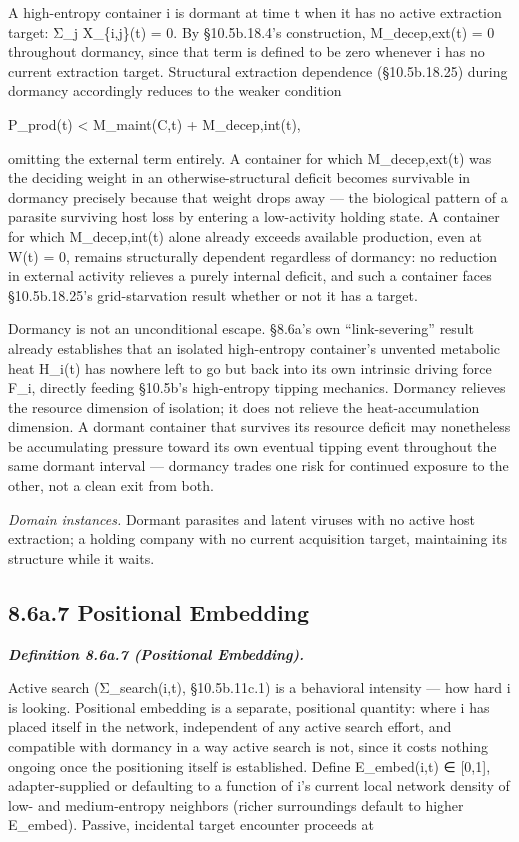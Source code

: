 \documentclass[
]{article}
\begin{document}
A high-entropy container i is dormant at time t when it has no active
extraction target: Σ\_j X\_\{i,j\}(t) = 0. By §10.5b.18.4's
construction, M\_decep,ext(t) = 0 throughout dormancy, since that term
is defined to be zero whenever i has no current extraction target.
Structural extraction dependence (§10.5b.18.25) during dormancy
accordingly reduces to the weaker condition

P\_prod(t) \textless{} M\_maint(C,t) + M\_decep,int(t),

omitting the external term entirely. A container for which
M\_decep,ext(t) was the deciding weight in an otherwise-structural
deficit becomes survivable in dormancy precisely because that weight
drops away --- the biological pattern of a parasite surviving host loss
by entering a low-activity holding state. A container for which
M\_decep,int(t) alone already exceeds available production, even at W(t)
= 0, remains structurally dependent regardless of dormancy: no reduction
in external activity relieves a purely internal deficit, and such a
container faces §10.5b.18.25's grid-starvation result whether or not it
has a target.

Dormancy is not an unconditional escape. §8.6a's own ``link-severing''
result already establishes that an isolated high-entropy container's
unvented metabolic heat H\_i(t) has nowhere left to go but back into its
own intrinsic driving force F\_i, directly feeding §10.5b's high-entropy
tipping mechanics. Dormancy relieves the resource dimension of
isolation; it does not relieve the heat-accumulation dimension. A
dormant container that survives its resource deficit may nonetheless be
accumulating pressure toward its own eventual tipping event throughout
the same dormant interval --- dormancy trades one risk for continued
exposure to the other, not a clean exit from both.

\emph{Domain instances.} Dormant parasites and latent viruses with no
active host extraction; a holding company with no current acquisition
target, maintaining its structure while it waits.

\hypertarget{a.7-positional-embedding}{%
\subsection{8.6a.7 Positional
Embedding}\label{a.7-positional-embedding}}

\emph{\textbf{Definition 8.6a.7 (Positional Embedding).}}

Active search (Σ\_search(i,t), §10.5b.11c.1) is a behavioral intensity
--- how hard i is looking. Positional embedding is a separate,
positional quantity: where i has placed itself in the network,
independent of any active search effort, and compatible with dormancy in
a way active search is not, since it costs nothing ongoing once the
positioning itself is established. Define E\_embed(i,t) ∈ {[}0,1{]},
adapter-supplied or defaulting to a function of i's current local
network density of low- and medium-entropy neighbors (richer
surroundings default to higher E\_embed). Passive, incidental target
encounter proceeds at
\end{document}
